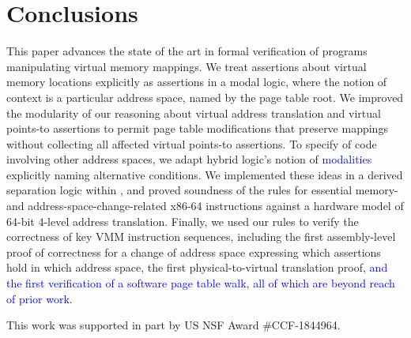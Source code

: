 \documentclass[acmsmall,screen]{acmart}
\newcommand{\add}[1]{\textcolor{blue}{#1}}
\newcommand{\add}[1]{{#1}}
\begin{document}
{
\theoremstyle{acmdefinition}
\newtheorem{assumption}[theorem]{Assumption}
}


%



%


\section{Conclusions}
This paper advances the state of the art in formal verification of programs manipulating virtual memory mappings.
We treat assertions about virtual memory locations explicitly as assertions in a modal logic, where the notion of context
is a particular address space, named by the page table root.
We improved the modularity of our reasoning about virtual address translation and virtual points-to assertions
to permit page table modifications that
preserve mappings without collecting all affected virtual points-to assertions.
To specify of code involving other address spaces, we adapt 
hybrid logic's notion of \add{modalities} explicitly naming alternative conditions.
We implemented these ideas in a derived separation logic within \iris, and proved soundness of
the rules for essential memory- and address-space-change-related x86-64 instructions 
against a hardware model of 64-bit 4-level address translation.
Finally, we used our rules to verify the correctness of key VMM instruction sequences,
including the first assembly-level proof of correctness for a change
of address space expressing which assertions hold in which address space, 
the first physical-to-virtual translation proof,
\add{and the first verification of a software page table walk, all of which
are beyond reach of prior work}.

\begin{acks}
This work was supported in part by US NSF Award \#CCF-1844964.
\end{acks}



\end{document}
